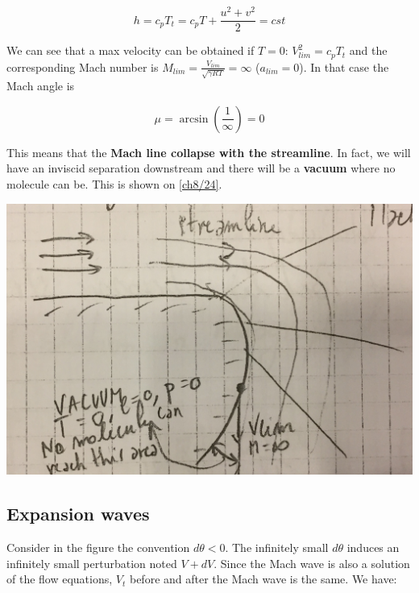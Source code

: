 	\begin{equation}
	h = c_pT_t = c_p T + \frac{u^2 + v^2}{2} = cst
	\end{equation}
	
	We can see that a max velocity can be obtained if $T = 0$: $V_{lim}^2 = c_p T_t$ and the corresponding Mach number is $M_{lim} = \frac{V_{lim}}{\sqrt{\gamma RT}} = \infty$ ($a_{lim}=0$). In that case the Mach angle is 
	
	\begin{equation}
	\mu = \arcsin \left( \frac{1}{\infty} \right) = 0
	\end{equation}
	
	This means that the \textbf{Mach line collapse with the streamline}. In fact, we will have an inviscid separation downstream and there will be a \textbf{vacuum} where no molecule can be. This is shown on \autoref{ch8/24}.
	
	\begin{center}
	\includegraphics[scale=0.08]{ch8/24}
	\label{ch8/24}
	\end{center}
	
\subsection{Expansion waves}
	Consider in the figure the convention $d\theta < 0$. The infinitely small $d\theta$ induces an infinitely small perturbation noted $V+dV$. Since the Mach wave is also a solution of the flow equations, $V_t$ before and after the Mach wave is the same. We have: 
	
	\ \\
	
